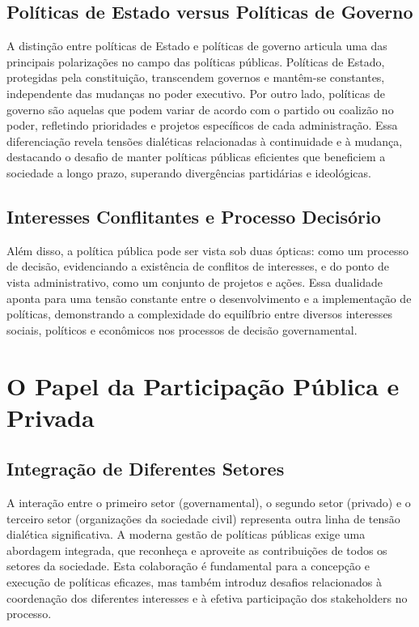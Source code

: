 \documentclass[
   article,       
   12pt,          
   oneside,       
   a4paper,       
   english,       
   brazil,        
   sumario=tradicional
   ]{abntex2}
\begin{document}
\subsection{Políticas de Estado versus Políticas de Governo}
A distinção entre políticas de Estado e políticas de governo articula uma das principais polarizações no campo das políticas públicas. Políticas de Estado, protegidas pela constituição, transcendem governos e mantêm-se constantes, independente das mudanças no poder executivo. Por outro lado, políticas de governo são aquelas que podem variar de acordo com o partido ou coalizão no poder, refletindo prioridades e projetos específicos de cada administração. Essa diferenciação revela tensões dialéticas relacionadas à continuidade e à mudança, destacando o desafio de manter políticas públicas eficientes que beneficiem a sociedade a longo prazo, superando divergências partidárias e ideológicas.

\subsection{Interesses Conflitantes e Processo Decisório}
Além disso, a política pública pode ser vista sob duas ópticas: como um processo de decisão, evidenciando a existência de conflitos de interesses, e do ponto de vista administrativo, como um conjunto de projetos e ações. Essa dualidade aponta para uma tensão constante entre o desenvolvimento e a implementação de políticas, demonstrando a complexidade do equilíbrio entre diversos interesses sociais, políticos e econômicos nos processos de decisão governamental.

\section{O Papel da Participação Pública e Privada}
\subsection{Integração de Diferentes Setores}
A interação entre o primeiro setor (governamental), o segundo setor (privado) e o terceiro setor (organizações da sociedade civil) representa outra linha de tensão dialética significativa. A moderna gestão de políticas públicas exige uma abordagem integrada, que reconheça e aproveite as contribuições de todos os setores da sociedade. Esta colaboração é fundamental para a concepção e execução de políticas eficazes, mas também introduz desafios relacionados à coordenação dos diferentes interesses e à efetiva participação dos stakeholders no processo.
\end{document}
